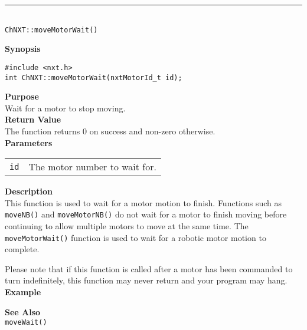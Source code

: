 \noindent
\vspace{5pt}
\rule{4.5in}{0.015in}\\
\noindent
{\LARGE \texttt{ChNXT::moveMotorWait()}}\\
{}

\noindent
{\bf Synopsis}
\begin{lstlisting}
#include <nxt.h>
int ChNXT::moveMotorWait(nxtMotorId_t id);
\end{lstlisting}

\noindent
{\bf Purpose}\\
Wait for a motor to stop moving.\\

\noindent
{\bf Return Value}\\
The function returns 0 on success and non-zero otherwise.\\

\noindent
{\bf Parameters}
\vspace{-0.1in}
\begin{description}
\item               
\begin{tabular}{p{10 mm}p{145 mm}}
\texttt{id} & The motor number to wait for. \\
\end{tabular}
\end{description}

\noindent
{\bf Description}\\
This function is used to wait for a motor motion to finish. Functions such as
\texttt{moveNB()} and \texttt{moveMotorNB()} do not wait for a motor to finish
moving before continuing to allow multiple motors to move at the same time. The
\texttt{moveMotorWait()} function is used to wait for a 
robotic motor motion to complete.

Please note that if this function is called after a motor has been commanded to
turn indefinitely, this function may never return and your program may hang.\\

\noindent
{\bf Example}

\noindent
{\bf See Also}\\
\texttt{moveWait()}

